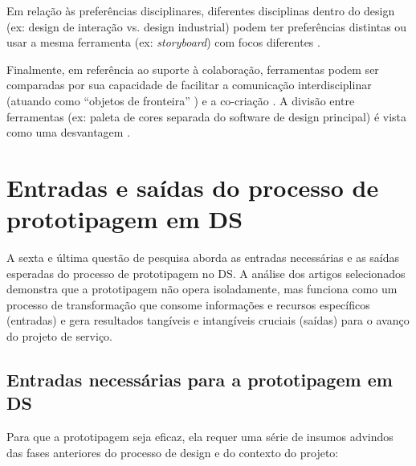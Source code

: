 Em relação às preferências disciplinares, diferentes disciplinas dentro do design (ex: design de interação vs. design industrial) podem ter preferências distintas ou usar a mesma ferramenta (ex: \textit{storyboard}) com focos diferentes \cite{wang2023smartproducts}.

Finalmente, em referência ao suporte à colaboração, ferramentas podem ser comparadas por sua capacidade de facilitar a comunicação interdisciplinar (atuando como ``objetos de fronteira'' \cite{paust2025integrative}) e a co-criação \cite{soto2023prototyping}. A divisão entre ferramentas (ex: paleta de cores separada do software de design principal) é vista como uma desvantagem \cite{hegemann2024palette}.



\section{Entradas e saídas do processo de prototipagem em DS}

A sexta e última questão de pesquisa aborda as entradas necessárias e as saídas esperadas do processo de prototipagem no DS. A análise dos artigos selecionados demonstra que a prototipagem não opera isoladamente, mas funciona como um processo de transformação que consome informações e recursos específicos (entradas) e gera resultados tangíveis e intangíveis cruciais (saídas) para o avanço do projeto de serviço.

\subsection{Entradas necessárias para a prototipagem em DS}

Para que a prototipagem seja eficaz, ela requer uma série de insumos advindos das fases anteriores do processo de design e do contexto do projeto:

